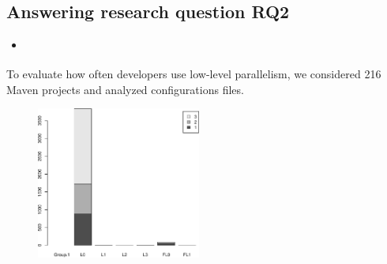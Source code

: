 \subsection{Answering research question RQ2}
\label{sec:rqTwo}

\begin{itemize}
    \item \emph{\RQB}
\end{itemize}

To evaluate how often developers use low-level parallelism, we
considered 216 Maven projects and analyzed  configurations
files. 

\begin{figure}[h!]
   \centering
    \includegraphics[width=0.48\textwidth]{plots/barplot-parprev.pdf}
   \caption{}
\end{figure}


